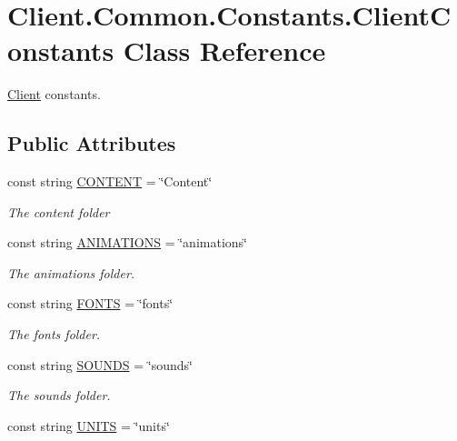 \hypertarget{classClient_1_1Common_1_1Constants_1_1ClientConstants}{}\section{Client.\+Common.\+Constants.\+Client\+Constants Class Reference}
\label{classClient_1_1Common_1_1Constants_1_1ClientConstants}


\hyperlink{namespaceClient}{Client} constants.  


\subsection*{Public Attributes}
\begin{DoxyCompactItemize}
\item 
const string \hyperlink{classClient_1_1Common_1_1Constants_1_1ClientConstants_a6a503802cb4583e413cafa1fa759de04}{C\+O\+N\+T\+E\+N\+T} = \char`\"{}Content\char`\"{}
\begin{DoxyCompactList}\small\item\em The content folder \end{DoxyCompactList}\item 
const string \hyperlink{classClient_1_1Common_1_1Constants_1_1ClientConstants_a9907e83964bdd6b6be421998c11da3aa}{A\+N\+I\+M\+A\+T\+I\+O\+N\+S} = \char`\"{}animations\char`\"{}
\begin{DoxyCompactList}\small\item\em The animations folder. \end{DoxyCompactList}\item 
const string \hyperlink{classClient_1_1Common_1_1Constants_1_1ClientConstants_aa41cd7e41afa090bd6c9e5210d027b78}{F\+O\+N\+T\+S} = \char`\"{}fonts\char`\"{}
\begin{DoxyCompactList}\small\item\em The fonts folder. \end{DoxyCompactList}\item 
const string \hyperlink{classClient_1_1Common_1_1Constants_1_1ClientConstants_ae00a816305ea5351060f814be2949c9a}{S\+O\+U\+N\+D\+S} = \char`\"{}sounds\char`\"{}
\begin{DoxyCompactList}\small\item\em The sounds folder. \end{DoxyCompactList}\item 
const string \hyperlink{classClient_1_1Common_1_1Constants_1_1ClientConstants_aba7bdfaf79e97fe67cca425d84574d40}{U\+N\+I\+T\+S} = \char`\"{}units\char`\"{}

\end{DoxyCompactItemize}
